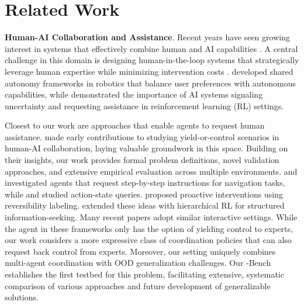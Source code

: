 \section{Related Work}\label{sec:related_work}

\textbf{Human-AI Collaboration and Assistance}.
Recent years have seen growing interest in systems that effectively combine human and AI capabilities \citep{wu2022ai, pflanzer2023ethics,fragiadakis2024evaluating,vats2024survey}. A central challenge in this domain is designing human-in-the-loop systems that strategically leverage human expertise while minimizing intervention costs \citep{10.5555/3237383.3238074, nguyen2021learning}. \citet{reddy2018shared} developed shared autonomy frameworks in robotics that balance user preferences with autonomous capabilities, while \citet{retzlaff2024human} demonstrated the importance of AI systems signaling uncertainty and requesting assistance in reinforcement learning (RL) settings.

Closest to our work are approaches that enable agents to request human assistance. \citet{trinh2024getting} made early contributions to studying yield-or-control scenarios in human-AI collaboration, laying valuable groundwork in this space. Building on their insights, our work provides formal problem definitions, novel validation approaches, and extensive empirical evaluation across multiple environments. \citet{nguyen-daume-iii-2019-help} and \citet{Nguyen_2019_CVPR} investigated agents that request step-by-step instructions for navigation tasks, while \citet{da2020uncertainty} and \citet{singh2022ask4help} studied action-state queries. \citet{xie2022ask} proposed proactive interventions using reversibility labeling.
\citet{nguyen2021learning} extended these ideas with hierarchical RL for structured information-seeking.
Many recent papers \citep{shi2022learning,singh2022ask4help,liu2022asking,knowno2023} adopt similar interactive settings.
While the agent in these frameworks only has the option of yielding control to experts, our work considers a more expressive class of coordination policies that can also request back control from experts. 
Moreover, our setting uniquely combines multi-agent coordination with OOD generalization challenges. Our \ourMethod-Bench establishes the first testbed for this problem, facilitating extensive, systematic comparison of various approaches and future development of generalizable solutions. 



